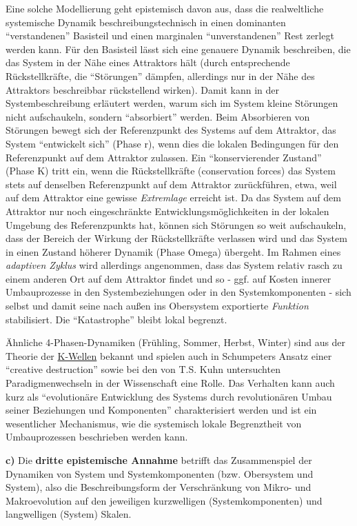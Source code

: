 \documentclass[11pt,a4paper]{article}
\begin{document}
Eine solche Modellierung geht epistemisch davon aus, dass die
realweltliche systemische Dynamik beschreibungstechnisch in einen
dominanten ``verstandenen'' Basisteil und einen marginalen
``unverstandenen'' Rest zerlegt werden kann. Für den Basisteil lässt
sich eine genauere Dynamik beschreiben, die das System in der Nähe eines
Attraktors hält (durch entsprechende Rückstellkräfte, die ``Störungen''
dämpfen, allerdings nur in der Nähe des Attraktors beschreibbar
rückstellend wirken). Damit kann in der Systembeschreibung erläutert
werden, warum sich im System kleine Störungen nicht aufschaukeln,
sondern ``absorbiert'' werden. Beim Absorbieren von Störungen bewegt
sich der Referenzpunkt des Systems auf dem Attraktor, das System
``entwickelt sich'' (Phase r), wenn dies die lokalen Bedingungen für den
Referenzpunkt auf dem Attraktor zulassen. Ein ``konservierender
Zustand'' (Phase K) tritt ein, wenn die Rückstellkräfte (conservation
forces) das System stets auf denselben Referenzpunkt auf dem Attraktor
zurückführen, etwa, weil auf dem Attraktor eine gewisse
\emph{Extremlage} erreicht ist. Da das System auf dem Attraktor nur noch
eingeschränkte Entwicklungsmöglichkeiten in der lokalen Umgebung des
Referenzpunkts hat, können sich Störungen so weit aufschaukeln, dass der
Bereich der Wirkung der Rückstellkräfte verlassen wird und das System in
einen Zustand höherer Dynamik (Phase Omega) übergeht. Im Rahmen eines
\emph{adaptiven Zyklus} wird allerdings angenommen, dass das System
relativ rasch zu einem anderen Ort auf dem Attraktor findet und so -
ggf. auf Kosten innerer Umbauprozesse in den Systembeziehungen oder in
den Systemkomponenten - sich selbst und damit seine nach außen ins
Obersystem exportierte \emph{Funktion} stabilisiert. Die ``Katastrophe''
bleibt lokal begrenzt.

Ähnliche 4-Phasen-Dynamiken (Frühling, Sommer, Herbst, Winter) sind aus
der Theorie der
\href{https://de.wikipedia.org/wiki/Kondratjew-Zyklus}{K-Wellen} bekannt
und spielen auch in Schumpeters Ansatz einer ``creative destruction''
sowie bei den von T.S. Kuhn untersuchten Paradigmenwechseln in der
Wissenschaft eine Rolle. Das Verhalten kann auch kurz als ``evolutionäre
Entwicklung des Systems durch revolutionären Umbau seiner Beziehungen
und Komponenten'' charakterisiert werden und ist ein wesentlicher
Mechanismus, wie die systemisch lokale Begrenztheit von Umbauprozessen
beschrieben werden kann.

\textbf{c)} Die \textbf{dritte epistemische Annahme} betrifft das
Zusammenspiel der Dynamiken von System und Systemkomponenten (bzw.
Obersystem und System), also die Beschreibungsform der Verschränkung von
Mikro- und Makroevolution auf den jeweiligen kurzwelligen
(Systemkomponenten) und langwelligen (System) Skalen.
\end{document}
